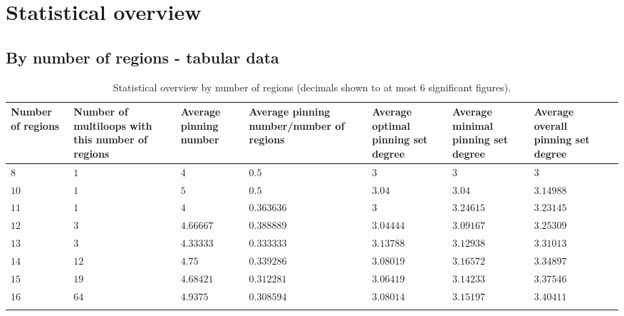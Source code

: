 \documentclass{article}%
\begin{document}
\tableofcontents

\newpage






\small

\newpage

\section{Statistical overview}
\label{sec:stats}

\subsection{By number of regions - tabular data}
\label{sec:byRegions}

\begin{table}[ht]
	\caption{Statistical overview by number of regions (decimals shown to at most $6$ significant figures).}
	\centering
	\renewcommand{\arraystretch}{1.5}
	\begin{tabularx}{\textwidth}{lXXXXXXX}
		\toprule
			Number of regions & Number of multiloops with this number of regions & Average pinning number & Average pinning number/number of regions & Average optimal pinning set degree & Average minimal pinning set degree & Average overall pinning set degree\\
			\hline
			$8$ & $1$ & $4$ & $0.5$ & $3$ & $3$ & $3$ \\
			$10$ & $1$ & $5$ & $0.5$ & $3.04$ & $3.04$ & $3.14988$ \\
			$11$ & $1$ & $4$ & $0.363636$ & $3$ & $3.24615$ & $3.23145$ \\
			$12$ & $3$ & $4.66667$ & $0.388889$ & $3.04444$ & $3.09167$ & $3.25309$ \\
			$13$ & $3$ & $4.33333$ & $0.333333$ & $3.13788$ & $3.12938$ & $3.31013$ \\
			$14$ & $12$ & $4.75$ & $0.339286$ & $3.08019$ & $3.16572$ & $3.34897$ \\
			$15$ & $19$ & $4.68421$ & $0.312281$ & $3.06419$ & $3.14233$ & $3.37546$ \\
			$16$ & $64$ & $4.9375$ & $0.308594$ & $3.08014$ & $3.15197$ & $3.40411$ \\
		\bottomrule \\ 
	\end{tabularx}
\end{table}

\newpage
\end{document}
